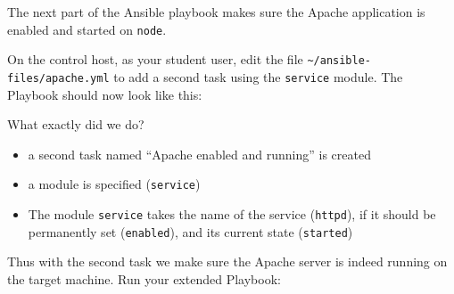 The next part of the Ansible playbook makes sure the Apache application
is enabled and started on \texttt{node}.

On the control host, as your student user, edit the file
\texttt{\textasciitilde{}/ansible-files/apache.yml} to add a second task
using the \texttt{service} module. The Playbook should now look like
this:

\begin{Shaded}
\begin{Highlighting}[]
\PreprocessorTok{{-}{-}{-}}
\KeywordTok{{-}}\AttributeTok{ }\KeywordTok{:}
\AttributeTok{  }\KeywordTok{:}
\AttributeTok{  }\KeywordTok{:}\AttributeTok{ }
\AttributeTok{  }\KeywordTok{:}
\AttributeTok{    }\KeywordTok{{-}}\AttributeTok{ }\KeywordTok{:}
\AttributeTok{      }\KeywordTok{:}
\AttributeTok{        }\KeywordTok{:}
\AttributeTok{    }\KeywordTok{{-}}\AttributeTok{ }\KeywordTok{:}
\AttributeTok{      }\KeywordTok{:}
\AttributeTok{        }\KeywordTok{:}
\AttributeTok{        }\KeywordTok{:}\AttributeTok{ }
\AttributeTok{        }\KeywordTok{:}
\end{Highlighting}
\end{Shaded}

What exactly did we do?

\begin{itemize}
\tightlist
\item
  a second task named ``Apache enabled and running'' is created
\item
  a module is specified (\texttt{service})
\item
  The module \texttt{service} takes the name of the service
  (\texttt{httpd}), if it should be permanently set (\texttt{enabled}),
  and its current state (\texttt{started})
\end{itemize}

Thus with the second task we make sure the Apache server is indeed
running on the target machine. Run your extended Playbook:

\begin{Shaded}
\begin{Highlighting}[]
\ExtensionTok{[student@controller}\NormalTok{ \textasciitilde{}]$ ansible{-}navigator run apache.yml}
\end{Highlighting}
\end{Shaded}

